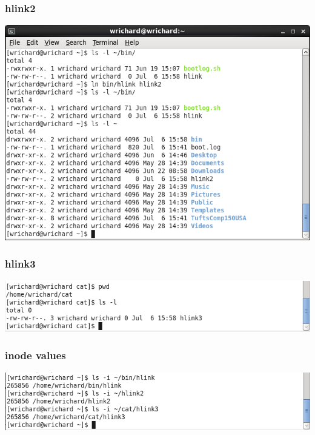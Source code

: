 \documentclass[a4paper,10pt]{article}
\begin{document}
\subsubsection{hlink2}
  \begin{center}
  \includegraphics[width=\linewidth]{./hlink2.png}
  \end{center}

\subsubsection{hlink3}
  \begin{center}
  \includegraphics[width=\linewidth]{./hlink3.png}
  \end{center}

\subsubsection{inode values}
  \begin{center}
  \includegraphics[width=\linewidth]{./hlink_inode.png}
  \end{center}
\end{document}
